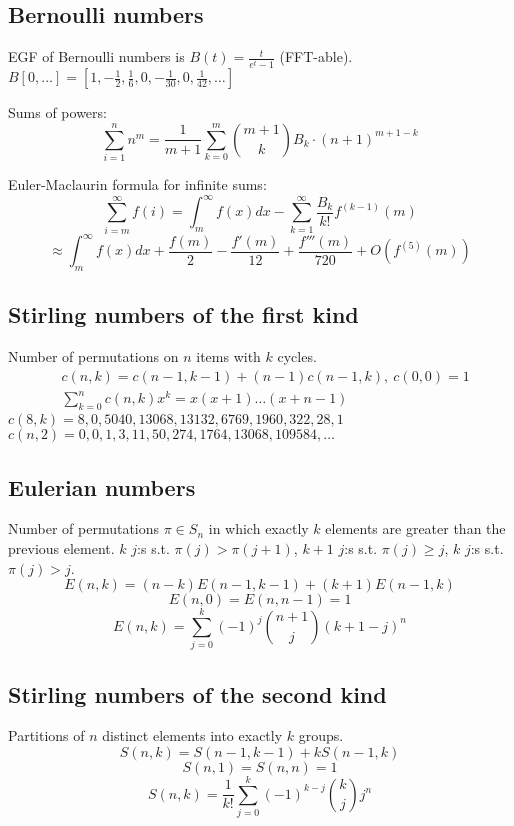 	\subsection{Bernoulli numbers}
		EGF of Bernoulli numbers is $B(t)=\frac{t}{e^t-1}$ (FFT-able).
		$B[0,\ldots] = [1, -\frac{1}{2}, \frac{1}{6}, 0, -\frac{1}{30}, 0, \frac{1}{42}, \ldots]$

		Sums of powers:
		\small
		\[ \sum_{i=1}^n n^m = \frac{1}{m+1} \sum_{k=0}^m \binom{m+1}{k} B_k \cdot (n+1)^{m+1-k} \]
		\normalsize

		Euler-Maclaurin formula for infinite sums:
		\small
		\[ \sum_{i=m}^{\infty} f(i) = \int_m^\infty f(x) dx - \sum_{k=1}^\infty \frac{B_k}{k!}f^{(k-1)}(m) \]
		\[ \approx \int_{m}^\infty f(x)dx + \frac{f(m)}{2} - \frac{f'(m)}{12} + \frac{f'''(m)}{720} + O(f^{(5)}(m)) \]
		\normalsize

	\subsection{Stirling numbers of the first kind}
		Number of permutations on $n$ items with $k$ cycles.
		\begin{align*}
			&c(n,k) = c(n-1,k-1) + (n-1) c(n-1,k),\ c(0,0) = 1 \\
			&\textstyle \sum_{k=0}^n c(n,k)x^k = x(x+1) \dots (x+n-1)
		\end{align*}
		$c(8,k) = 8, 0, 5040, 13068, 13132, 6769, 1960, 322, 28, 1$ \\
		$c(n,2) = 0, 0, 1, 3, 11, 50, 274, 1764, 13068, 109584, \dots$

	\subsection{Eulerian numbers}
		Number of permutations $\pi \in S_n$ in which exactly $k$ elements are greater than the previous element. $k$ $j$:s s.t. $\pi(j)>\pi(j+1)$, $k+1$ $j$:s s.t. $\pi(j)\geq j$, $k$ $j$:s s.t. $\pi(j)>j$.
		$$E(n,k) = (n-k)E(n-1,k-1) + (k+1)E(n-1,k)$$
		$$E(n,0) = E(n,n-1) = 1$$
		$$E(n,k) = \sum_{j=0}^k(-1)^j\binom{n+1}{j}(k+1-j)^n$$

	\subsection{Stirling numbers of the second kind}
		Partitions of $n$ distinct elements into exactly $k$ groups.
		$$S(n,k) = S(n-1,k-1) + k S(n-1,k)$$
		$$S(n,1) = S(n,n) = 1$$
		$$S(n,k) = \frac{1}{k!}\sum_{j=0}^k (-1)^{k-j}\binom{k}{j}j^n$$

